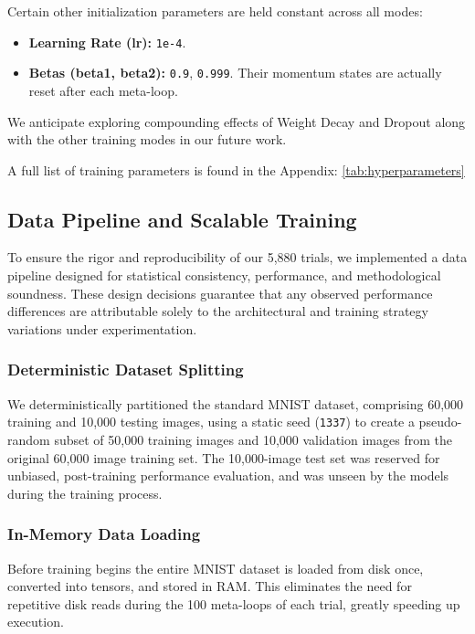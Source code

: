 \documentclass[conference]{IEEEtran}
\begin{document}
Certain other initialization parameters are held constant across all modes:

\begin{itemize}
    \item \textbf{Learning Rate (lr):} \verb|1e-4|.
    \item \textbf{Betas (beta1, beta2):} \verb|0.9|, \verb|0.999|. Their momentum states are actually reset after each meta-loop.
\end{itemize}

We anticipate exploring compounding effects of Weight Decay and Dropout along with the other training modes in our future work.

A full list of training parameters is found in the Appendix: \ref{tab:hyperparameters}

\subsection{Data Pipeline and Scalable Training}

To ensure the rigor and reproducibility of our 5,880 trials, we implemented a data pipeline designed for statistical consistency, performance, and methodological soundness. These design decisions guarantee that any observed performance differences are attributable solely to the architectural and training strategy variations under experimentation.

\subsubsection{Deterministic Dataset Splitting}

We deterministically partitioned the standard MNIST dataset, comprising 60,000 training and 10,000 testing images, using a static seed (\verb|1337|) to create a pseudo-random subset of 50,000 training images and 10,000 validation images from the original 60,000 image training set. The 10,000-image test set was reserved for unbiased, post-training performance evaluation, and was unseen by the models during the training process.

\subsubsection{In-Memory Data Loading}

Before training begins the entire MNIST dataset is loaded from disk once, converted into tensors, and stored in RAM. This eliminates the need for repetitive disk reads during the 100 meta-loops of each trial, greatly speeding up execution.
\end{document}

